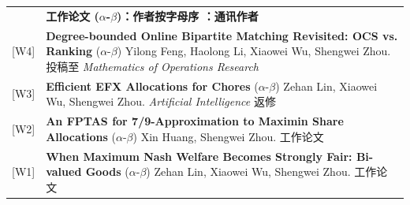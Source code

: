 \documentclass[UTF8, fontset=none, letterpaper, 11pt]{ctexart}
\newcommand{\headingfont}{\Large\bfseries\color{OliveGreen}}
\newenvironment{SectionTable}[1]{
  \renewcommand*{\arraystretch}{1.2}
  \setlength{\tabcolsep}{10pt}
  \begin{longtable}{Rp{5.2in}} & #1 \\}
{\end{longtable}\vspace{-1cm}}
\begin{document}
\begin{SectionTable}{\headingfont 工作论文 \; \small\color{black}  ($\alpha$-$\beta$)：作者按字母序 \quad \Letter：通讯作者}
{[W4]} &
\textbf{Degree-bounded Online Bipartite Matching Revisited: OCS vs. Ranking} \newline
($\alpha$-$\beta$) Yilong Feng, Haolong Li, Xiaowei Wu, Shengwei Zhou.  \newline
投稿至 \textit{Mathematics of Operations Research}\\

{[W3]} &
\textbf{Efficient EFX Allocations for Chores} \newline
($\alpha$-$\beta$) Zehan Lin, Xiaowei Wu, Shengwei Zhou.  \newline
\textit{Artificial Intelligence} 返修\\

{[W2]} &
\textbf{An FPTAS for 7/9-Approximation to Maximin Share Allocations} \newline
($\alpha$-$\beta$) Xin Huang, Shengwei Zhou.  \newline
工作论文\\

{[W1]} &
\textbf{When Maximum Nash Welfare Becomes Strongly Fair: Bi-valued Goods} \newline
($\alpha$-$\beta$) Zehan Lin, Xiaowei Wu, Shengwei Zhou.  \newline
工作论文\\
\end{SectionTable}
\end{document}
